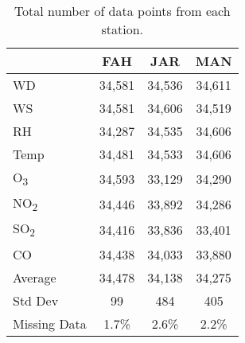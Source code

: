\begin{table}[H]
\centering
\caption{Total number of data points from each station.}
\label{tb:totalTrainPts}
\begin{tabular}{@{}lccc@{}}
\toprule
             & FAH    & JAR    & MAN    \\ \midrule
WD           & 34,581 & 34,536 & 34,611 \\
WS           & 34,581 & 34,606 & 34,519 \\
RH           & 34,287 & 34,535 & 34,606 \\
Temp         & 34,481 & 34,533 & 34,606 \\
O\textsubscript{3}           & 34,593 & 33,129 & 34,290 \\
NO\textsubscript{2}          & 34,446 & 33,892 & 34,286 \\
SO\textsubscript{2}          & 34,416 & 33,836 & 33,401 \\
CO           & 34,438 & 34,033 & 33,880 \\ \hline
Average      & 34,478 & 34,138 & 34,275 \\
Std Dev      & 99     & 484    & 405    \\ \hline
Missing Data & 1.7\%  & 2.6\%  & 2.2\%  \\ \bottomrule
\end{tabular}
\end{table}